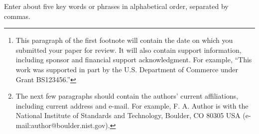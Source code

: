 \documentclass[journal,twoside,web]{ieeecolor}
\begin{document}
\title{}

\author{Georg Schramm and Martin Holler
\thanks{This paragraph of the first footnote will contain the date on which
you submitted your paper for review. It will also contain support information,
including sponsor and financial support acknowledgment. For example, 
``This work was supported in part by the U.S. Department of Commerce under Grant BS123456.'' }
\thanks{The next few paragraphs should contain the authors' current affiliations,
including current address and e-mail. For example, F. A. Author is with the
National Institute of Standards and Technology, Boulder, CO 80305 USA (e-mail:author@boulder.nist.gov). }
}

\maketitle

\begin{abstract}

\end{abstract}

\begin{IEEEkeywords}
Enter about five key words or phrases in alphabetical order, separated by commas.
\end{IEEEkeywords}



\printbibliography
\end{document}
